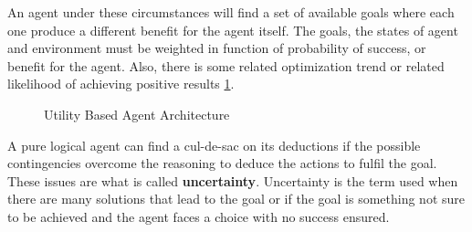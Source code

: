\documentclass[11pt,oneside,a4paper,openright]{report}
\begin{document}
\begin{description}
\begin{description}
		An agent under these circumstances will find a set of available goals where each one produce a
		different benefit for the agent itself. The goals, the states of agent and environment must be 
		weighted in function of probability of success, or benefit for the agent. Also, there is some related
		optimization trend or related likelihood of achieving positive results \ref{fig:utilityAgent_label}. 


		\begin{figure}[htbp!]
		\centering
		\setlength\fboxsep{0pt}
		\setlength\fboxrule{0.5pt}
		\caption{Utility Based Agent Architecture}
		\label{fig:utilityAgent_label}
		\end{figure}


		A pure logical agent can find a cul-de-sac on its deductions if the possible contingencies overcome
		the reasoning to deduce the actions to fulfil the goal. These issues are what is called
		\textbf{uncertainty}. Uncertainty is the term used when there are many solutions that lead to the
		goal or if the goal is something not sure to be achieved and the agent faces a choice with no 
		success ensured. 


\end{description}
\end{description}
\end{document}
